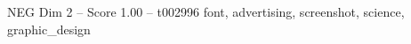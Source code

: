 \begin{textsample}{NEG Dim 2 – Score 1.00 – t002996}  \label{ex:f2_neg_009}
font, advertising, screenshot, science, graphic\_design

\end{textsample}
